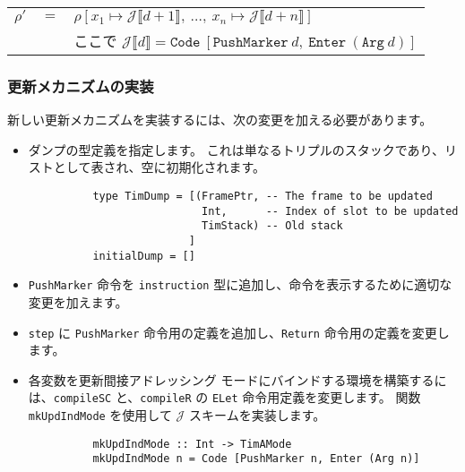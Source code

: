 \documentclass{jarticle}
\begin{document}
\begin{center}
	\begin{tabular}{r c l}
		$\rho'$ & $=$ & $\rho[x_1 \mapsto \mathcal{J} \llbracket d + 1 \rrbracket, ~ \ldots, ~ x_n \mapsto \mathcal{J} \llbracket d + n \rrbracket]$   \\
		        &     & ここで $\mathcal{J}\llbracket d \rrbracket = \texttt{Code} ~ [\texttt{PushMarker} ~ d, ~ \texttt{Enter} ~ (\texttt{Arg} ~ d)]$
	\end{tabular}
\end{center}

\subsubsection{更新メカニズムの実装}

新しい更新メカニズムを実装するには、次の変更を加える必要があります。

\begin{itemize}
	\item ダンプの型定義を指定します。
	      これは単なるトリプルのスタックであり、リストとして表され、空に初期化されます。
	      \begin{verbatim}
          type TimDump = [(FramePtr, -- The frame to be updated
                           Int,      -- Index of slot to be updated
                           TimStack) -- Old stack
                         ]
          initialDump = []
        \end{verbatim}
	\item \texttt{PushMarker} 命令を \texttt{instruction} 型に追加し、命令を表示するために適切な変更を加えます。
	\item \texttt{step} に \texttt{PushMarker} 命令用の定義を追加し、\texttt{Return} 命令用の定義を変更します。
	\item 各変数を更新間接アドレッシング モードにバインドする環境を構築するには、\texttt{compileSC} と、\texttt{compileR} の \texttt{ELet} 命令用定義を変更します。
	      関数 \texttt{mkUpdIndMode} を使用して $\mathcal{J}$ スキームを実装します。
	      \begin{verbatim}
          mkUpdIndMode :: Int -> TimAMode
          mkUpdIndMode n = Code [PushMarker n, Enter (Arg n)]
        \end{verbatim}
\end{itemize}
\end{document}
